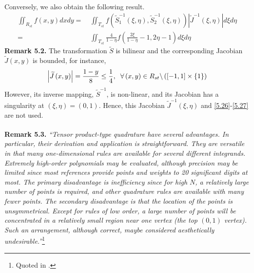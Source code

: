 \documentclass[a4paper]{article}
\numberwithin{equation}{section}
\begin{document}
Conversely, we also obtain the following result.
\begin{align}
\label{5.26}
  \iint_{{R_{st}}} {f\left( {x,y} \right)dxdy} =&\ \iint_{{T_{st}}} {f\left( {\widetilde S_1^{ - 1}\left( {\xi ,\eta } \right),\widetilde S_2^{ - 1}\left( {\xi ,\eta } \right)} \right)\left| {{{\widetilde J}^{ - 1}}\left( {\xi ,\eta } \right)} \right|d\xi d\eta } \\
  =&\ \iint_{{T_{st}}} {\frac{4}{{1 - \eta }}f\left( {\frac{{2\xi }}{{1 - \eta }} - 1,2\eta  - 1} \right)d\xi d\eta } \label{5.27}
\end{align}
\textbf{Remark 5.2.} The transformation $\widetilde S$ is bilinear and the corresponding Jacobian ${\widetilde J\left( {x,y} \right)}$ is bounded, for instance, 
\begin{align}
\left| {\widetilde J\left( {x,y} \right)} \right| = \frac{{1 - y}}{8} \le \frac{1}{4},\hspace{0.2cm}\forall \left( {x,y} \right) \in {R_{st}}\backslash \left( {\left[ { - 1,1} \right] \times \left\{ 1 \right\}} \right)
\end{align}
However, its inverse mapping, $\widetilde{S}^{-1}$, is non-linear, and its Jacobian has a singularity at $\left(\xi,\eta \right)=\left(0,1\right)$. Hence, this Jacobian ${{{\widetilde J}^{ - 1}}\left( {\xi ,\eta } \right)}$ and \eqref{5.26}-\eqref{5.27} are not used.\\
\\
\textbf{Remark 5.3.} \textit{``Tensor product-type quadrature have several advantages. In particular, their derivation and application is straightforward. They are versatile in that many one-dimensional rules are available for several different integrands. Extremely high-order polynomials may be evaluated, although precision may be limited since most references provide points and weights to 20 significant digits at most. The primary disadvantage is inefficiency since for high $N$, a relatively large number of points is required, and other quadrature rules are available with many fewer points. The secondary disadvantage is that the location of the points is unsymmetrical. Except for rules of low order, a large number of points will be concentrated in a relatively small region near one vertex (the top $\left(0,1\right)$ vertex). Such an arrangement, although correct, maybe considered aesthetically undesirable.''}\footnote{Quoted in \cite{7}.}
\end{document}

